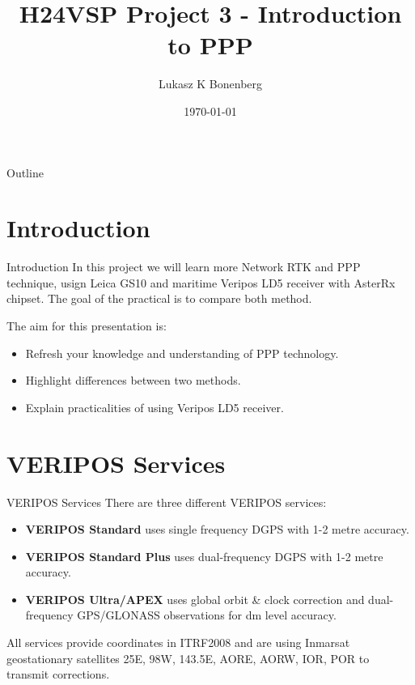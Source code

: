 \documentclass[12pt]{beamer}
\title[EnviroHack]{H24VSP Project 3 - Introduction to PPP}
\author{Lukasz K Bonenberg}
\institute{NGI}
\date{\today}
\begin{document}
	

\begin{frame}
	\titlepage
\end{frame}

	\begin{frame}{Outline}
	  \tableofcontents
	\end{frame}



\section{Introduction}

\begin{frame}{Introduction}
	In this project we will learn more Network RTK and PPP technique, usign Leica GS10 and maritime Veripos LD5 receiver with AsterRx chipset. The goal of the practical is to compare both method.
	
	\medskip
	The aim for this presentation is:
	\begin{itemize}
		\item Refresh your knowledge and understanding of PPP technology.
		\item Highlight differences between two methods. 
		\item Explain practicalities of using Veripos LD5 receiver.
	\end{itemize}
	

\end{frame}

\section{VERIPOS Services}

\begin{frame}{VERIPOS Services}
	There are three different VERIPOS services:

	\begin{itemize}
		\item \textbf{VERIPOS Standard} uses single frequency DGPS with 1-2 metre accuracy.
		\item \textbf{VERIPOS Standard Plus} uses dual-frequency DGPS with 1-2 metre accuracy. 
		\item \textbf{VERIPOS Ultra/APEX} uses global orbit \& clock correction and dual-frequency GPS/GLONASS observations for dm level accuracy.
	\end{itemize}
 All services provide coordinates in ITRF2008 and are using Inmarsat geostationary satellites 25E, 98W, 143.5E, AORE, AORW, IOR, POR to transmit corrections. 
\end{frame}
\end{document}

